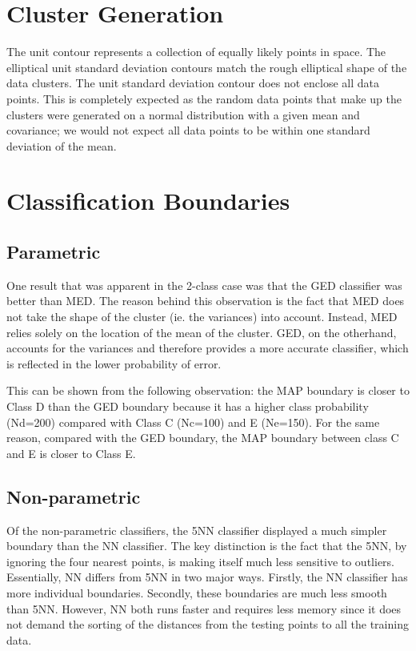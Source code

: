 \section{Cluster Generation}
The unit contour represents a collection of equally likely points in space. 
The elliptical unit standard deviation contours match the rough elliptical 
shape of the data clusters. The unit standard deviation contour does not 
enclose all data points.  This is completely expected as the random data 
points that make up the clusters were generated on a normal distribution with 
a given mean and covariance; we would not expect all data points to be within 
one standard deviation of the mean.

\section{Classification Boundaries}


\subsection{Parametric}

One result that was apparent in the 2-class case was that the GED classifier 
was better than MED.  The reason behind this observation is the fact that MED
does not take the shape of the cluster (ie. the variances) into account. 
Instead, MED relies solely on the location of the mean of the cluster. GED, on
the otherhand, accounts for the variances and therefore provides a more
accurate classifier, which is reflected in the lower probability of error.

This can be shown from the following observation: the MAP boundary is closer to
Class D than the GED boundary because it has a higher class probability
(Nd=200) compared with Class C (Nc=100) and E (Ne=150). For the same reason, 
compared with the GED boundary, the MAP boundary between class C and E is 
closer to Class E.

\subsection{Non-parametric}

Of the non-parametric classifiers, the 5NN classifier displayed a much simpler 
boundary than the NN classifier.  The key distinction is the fact that the 5NN,
by ignoring the four nearest points, is making itself much less sensitive to 
outliers. Essentially, NN differs from 5NN in two major ways. Firstly, the NN 
classifier has more individual boundaries. Secondly, these boundaries are much 
less smooth than 5NN. However, NN both runs faster and requires less memory 
since it does not demand the sorting of the distances from the testing points 
to all the training data.

